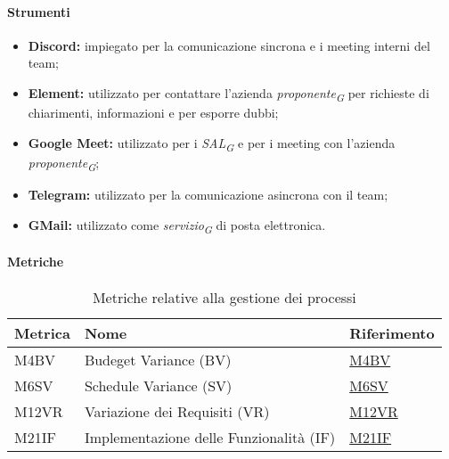 \paragraph{Strumenti}
\begin{itemize}
	\item \textbf{Discord:} impiegato per la comunicazione sincrona e i meeting interni del team;
	\item \textbf{Element:} utilizzato per contattare l'azienda \textit{proponente}\textsubscript{\textit{G}} per richieste di chiarimenti, informazioni e per esporre dubbi;
	\item \textbf{Google Meet:} utilizzato per i \textit{SAL}\textsubscript{\textit{G}} e per i meeting con l'azienda \textit{proponente}\textsubscript{\textit{G}};
	\item \textbf{Telegram:} utilizzato per la comunicazione asincrona con il team;
	\item \textbf{GMail:} utilizzato come \textit{servizio}\textsubscript{\textit{G}} di posta elettronica.
\end{itemize}
\vspace{0.1cm}

\paragraph{Metriche}
\begin{table}[H]
	\centering
	\begin{tabular}{|C{3cm}|C{4cm}|C{3cm}|}
	\hline
	\textbf{Metrica} & \textbf{Nome} & \textbf{Riferimento} \\
	\hline \hline
	M4BV & Budeget Variance (BV) &  \hyperlink{item:M4BV}{M4BV} \\
	M6SV & Schedule Variance (SV) &  \hyperlink{item:M6SV}{M6SV} \\
	M12VR & Variazione dei Requisiti (VR) &  \hyperlink{item:M12VR}{M12VR} \\
	M21IF & Implementazione delle Funzionalità (IF) & \hyperlink{item:M21IF}{M21IF} \\ 
	\hline
	\end{tabular}
	\caption{Metriche relative alla gestione dei processi}
\end{table}
